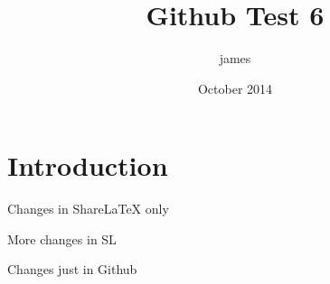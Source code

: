 \documentclass{article}
\title{Github Test 6}
\author{james }
\date{October 2014}
\begin{document}
\maketitle

\section{Introduction}

Changes in ShareLaTeX only

More changes in SL

Changes just in Github
\end{document}
